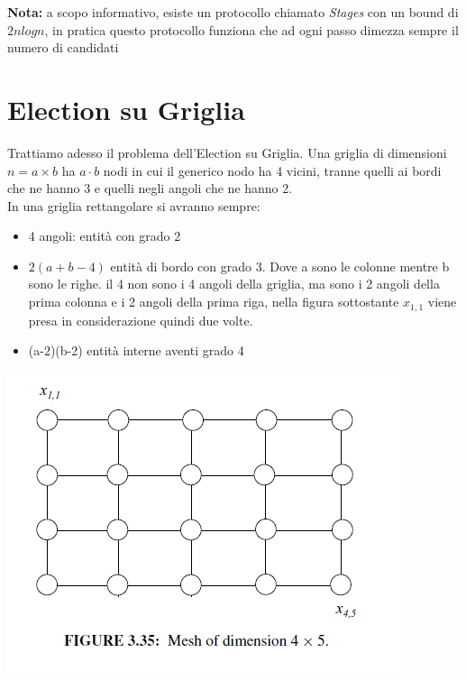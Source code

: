 
\begin{footnotesize}
    \textbf{Nota: }
    a scopo informativo, esiste un protocollo chiamato \emph{Stages} con un bound
    di $2n log n$, in pratica questo protocollo funziona che ad ogni passo dimezza
    sempre il numero di candidati
\end{footnotesize}

\section{Election su Griglia}
Trattiamo adesso il problema dell'Election su Griglia. Una griglia di dimensioni
$n = a \times b$ ha $a \cdot b$ nodi in cui il generico nodo ha 4 vicini, tranne
quelli ai bordi che ne hanno 3 e quelli negli angoli che ne hanno 2.\\
In una griglia rettangolare si avranno sempre:
\begin{itemize}
    \item 4 angoli: entità con grado 2
    \item $2(a+b-4)$ entità di bordo con grado 3. Dove a sono le colonne mentre b
          sono le righe. il 4 non sono i 4 angoli della griglia, ma sono i 2 angoli
          della prima colonna e i 2 angoli della prima riga, nella figura sottostante
          $x_{1,1}$ viene presa in considerazione quindi due volte.
    \item (a-2)(b-2) entità interne aventi grado 4
\end{itemize}
\begin{center}
    \includegraphics[scale=0.7]{images/griglia.png}
\end{center}

